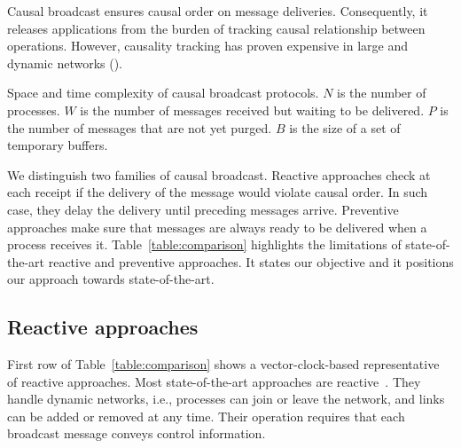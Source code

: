 Causal broadcast ensures causal order on message deliveries. Consequently, it
releases applications from the burden of tracking causal relationship between
operations. However, causality tracking has proven expensive in large and
dynamic networks (\REF).

\begin{table}
  \caption{\label{table:comparison} Space and time complexity of causal broadcast protocols. $N$ is the number of processes. $W$ is the number of messages received but waiting to be delivered.
    $P$ is the number of messages that are not yet purged.
    $B$ is the size of a set of temporary buffers.}
  
\end{table}

We distinguish two families of causal broadcast. Reactive approaches check at
each receipt if the delivery of the message would violate causal order. In such
case, they delay the delivery until preceding messages arrive. Preventive
approaches make sure that messages are always ready to be delivered when a
process receives it.  Table~\ref{table:comparison} highlights the limitations of
state-of-the-art reactive and preventive approaches. It states our objective and
it positions our approach towards state-of-the-art.

\subsection{Reactive approaches}

First row of Table~\ref{table:comparison} shows a vector-clock-based
representative~\cite{schwarz1994detecting} of reactive approaches. Most
state-of-the-art approaches are
reactive~\cite{almeida2008interval,fidge1988timestamps,hadzilacos1993fault,mattern1989virtual,mostefaoui2017probabilistic,singhal1992efficient}. They
handle dynamic networks, i.e., processes can join or leave the network, and
links can be added or removed at any time. Their operation requires that each
broadcast message conveys control information.


